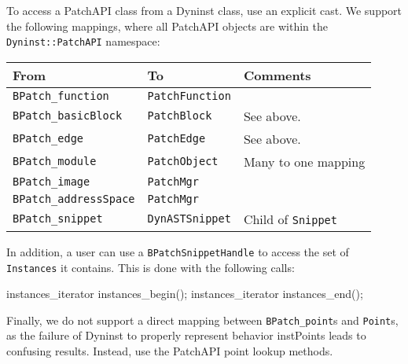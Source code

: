 To access a PatchAPI class from a Dyninst class, use an explicit
cast. We support the following mappings, where all PatchAPI objects
are within the \texttt{Dyninst::PatchAPI} namespace:

\begin{tabular}{|l|l|l|}
\hline
From & To & Comments \\
\hline 
\texttt{BPatch\_function} & \texttt{PatchFunction} & \\
\texttt{BPatch\_basicBlock} & \texttt{PatchBlock} & See above. \\
\texttt{BPatch\_edge} & \texttt{PatchEdge} & See above. \\
\texttt{BPatch\_module} & \texttt{PatchObject} & Many to one mapping \\
\texttt{BPatch\_image} & \texttt{PatchMgr} & \\
\texttt{BPatch\_addressSpace} & \texttt{PatchMgr} & \\
\texttt{BPatch\_snippet} & \texttt{DynASTSnippet} & Child of \texttt{Snippet} \\
\hline
\end{tabular}

In addition, a user can use a \texttt{BPatchSnippetHandle} to access
the set of \texttt{Instances} it contains. This is done with the
following calls:
\begin{apient}
instances_iterator instances_begin();
instances_iterator instances_end();
\end{apient}

Finally, we do not support a direct mapping between \texttt{BPatch\_point}s
and \texttt{Point}s, as the failure of Dyninst to properly represent
behavior instPoints leads to confusing results. Instead, use
the PatchAPI point lookup methods. 
    
